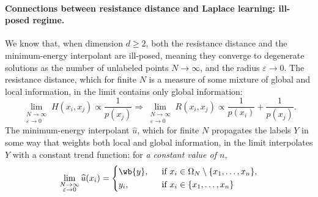 \documentclass{article}
\newcommand{\1}{\mathbf{1}}
\newcommand{\wh}[1]{\widehat{#1}}
\theoremstyle{definition}
\theoremstyle{remark}
\begin{document}
\paragraph{Connections between resistance distance and Laplace learning: ill-posed regime.}
We know that, when dimension $d \geq 2$, both the resistance distance and the minimum-energy interpolant are ill-posed, meaning they converge to degenerate solutions as the number of unlabeled points $N \to \infty$, and the radius $\varepsilon \to 0$. The resistance distance, which for finite $N$ is a measure of some mixture of global and local information, in the limit contains only global information:
\begin{equation}
\label{eqn:resistance_distance_illposed}
\lim_{\substack{N \to \infty \\ \varepsilon \to 0}}H(x_i,x_j) \propto \frac{1}{p(x_j)} \Longrightarrow \lim_{\substack{N \to \infty \\ \varepsilon \to 0}} R(x_i,x_j) \propto \frac{1}{p(x_i)} + \frac{1}{p(x_j)}.
\end{equation}
The minimum-energy interpolant $\wh{u}$, which for finite $N$ propagates the labels $Y$ in some way that weights both local and global information, in the limit interpolates $Y$ with a constant trend function: for \emph{a constant value of $n$}, 
\begin{equation}
\label{eqn:min_energy_interpolant_illposed}
\lim_{\substack{N \to \infty \\ \varepsilon \to 0}} \wh{u}(x_i) = 
\begin{cases*}
\wb{y},& ~~\textrm{if $x_i \in \Omega_N\setminus\{x_1,\ldots,x_n\}$},\\
y_i,& ~~\textrm{if $x_i \in \{x_1,\ldots,x_n\}$}
\end{cases*}
\end{equation}
\end{document}
